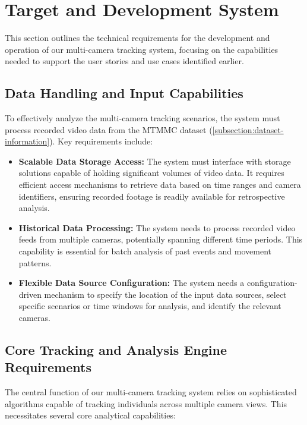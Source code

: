 \newpage

\section{Target and Development System}
\label{section:development-system}

This section outlines the technical requirements for the development and operation of our multi-camera tracking system, focusing on the capabilities needed to support the user stories and use cases identified earlier.

\subsection{Data Handling and Input Capabilities}
\label{subsection:data-handling-input}
To effectively analyze the multi-camera tracking scenarios, the system must process recorded video data from the MTMMC dataset (\ref{subsection:dataset-information}). Key requirements include:

\begin{itemize}[leftmargin=80pt]
    \item \textbf{Scalable Data Storage Access:} The system must interface with storage solutions capable of holding significant volumes of video data. It requires efficient access mechanisms to retrieve data based on time ranges and camera identifiers, ensuring recorded footage is readily available for retrospective analysis.
    \item \textbf{Historical Data Processing:} The system needs to process recorded video feeds from multiple cameras, potentially spanning different time periods. This capability is essential for batch analysis of past events and movement patterns.
    \item \textbf{Flexible Data Source Configuration:} The system needs a configuration-driven mechanism to specify the location of the input data sources, select specific scenarios or time windows for analysis, and identify the relevant cameras.
\end{itemize}

\subsection{Core Tracking and Analysis Engine Requirements}
\label{subsection:core-tracking-analysis}
The central function of our multi-camera tracking system relies on sophisticated algorithms capable of tracking individuals across multiple camera views. This necessitates several core analytical capabilities:

